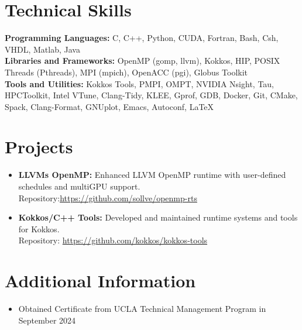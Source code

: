 \documentclass[11pt]{article}
\begin{document}
\section*{Technical Skills}
\textbf{Programming Languages:} C, C++, Python, CUDA, Fortran, Bash, Csh, VHDL, Matlab, Java\\
\textbf{Libraries and Frameworks:} OpenMP (gomp, llvm), Kokkos, HIP, POSIX Threads (Pthreads), MPI (mpich), OpenACC (pgi), Globus Toolkit\\
\textbf{Tools and Utilities:} Kokkos Tools, PMPI, OMPT, NVIDIA Nsight, Tau, HPCToolkit, Intel VTune, Clang-Tidy, KLEE, Gprof, GDB, Docker, Git, CMake, Spack, Clang-Format, GNUplot, Emacs, Autoconf, LaTeX

\section*{Projects}
\begin{itemize}[noitemsep,topsep=0pt]
    \item \textbf{LLVM\textquotesingle s OpenMP:} Enhanced LLVM OpenMP runtime with user-defined schedules and multiGPU support. \\Repository:\href{https://github.com/sollve/openmp-rts}{https://github.com/sollve/openmp-rts}
    \item \textbf{Kokkos/C++ Tools:} Developed and maintained runtime systems and tools for Kokkos. \\Repository: \href{https://github.com/kokkos/kokkos-tools}{https://github.com/kokkos/kokkos-tools}
\end{itemize}

\section*{Additional Information}
\begin{itemize}[noitemsep,topsep=0pt]
    \item  Obtained Certificate from UCLA Technical Management Program in September 2024
\end{itemize}
\end{document}
